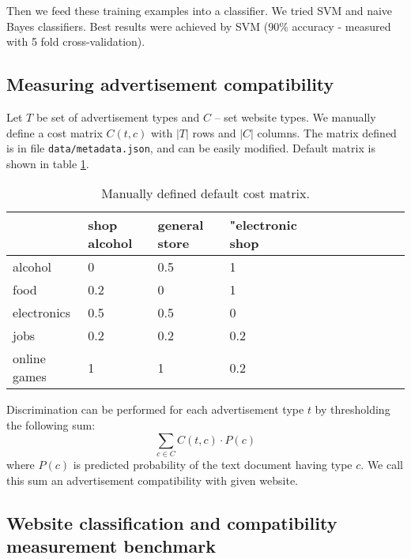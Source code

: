 \documentclass[a4paper]{article}
\begin{document}
Then we feed these training examples into a classifier.
We tried SVM and naive Bayes classifiers.
Best results were achieved by SVM (90\% accuracy - measured with 5 fold cross-validation).

\subsection{Measuring advertisement compatibility}
\label{mainlogic}

Let $T$ be set of advertisement types and $C$ -- set website types.
We manually define a cost matrix $C(t, c)$ 
with $|T|$ rows and $|C|$ columns.
The matrix defined is in file \texttt{data/metadata.json},
and can be easily modified. Default matrix is shown in table \ref{table:costmx}.

\begin{table}[!hbt]
    \caption{Manually defined default cost matrix.
    \label{table:costmx}
    }
\footnotesize
\begin{center}
    \begin{tabular}{|l|l|l|l|l|l|l|l|l|l|l|}
    \hline
        & shop alcohol & general store  & "electronic shop \\
    \hline
          alcohol & 0& 0.5&   1 \\
    \hline
        food & 0.2&   0&   1 \\
    \hline
        electronics & 0.5& 0.5&   0 \\
    \hline
        jobs & 0.2& 0.2& 0.2 \\
    \hline
          online games & 1&   1& 0.2 \\
    \hline
    \end{tabular}
\end{center}
\end{table}

Discrimination can be performed for each advertisement type $t$
by thresholding the following sum:
\begin{equation}
    \sum_{c\in{C}} {C(t, c) \cdot P(c)}
\end{equation}
where $P(c)$ is predicted probability of the text document having type $c$.
We call this sum an advertisement compatibility with given website.



\subsection{Website classification and compatibility measurement benchmark}
\end{document}
